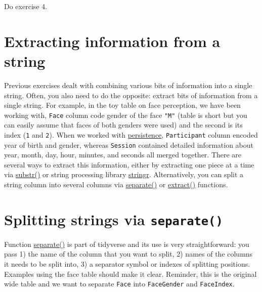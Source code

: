 \documentclass[
]{book}
\begin{document}
Do exercise 4.

\hypertarget{extracting-information-from-a-string}{%
\section{Extracting information from a string}\label{extracting-information-from-a-string}}

Previous exercises dealt with combining various bits of information into a single string. Often, you also need to do the opposite: extract bits of information from a single string. For example, in the toy table on face perception, we have been working with, \texttt{Face} column code gender of the face \texttt{"M"} (table is short but you can easily assume that faces of both genders were used) and the second is its index (\texttt{1} and \texttt{2}). When we worked with \href{data/persistence.csv}{persistence}, \texttt{Participant} column encoded year of birth and gender, whereas \texttt{Session} contained detailed information about year, month, day, hour, minutes, and seconds all merged together. There are several ways to extract this information, either by extracting one piece at a time via \href{https://stat.ethz.ch/R-manual/R-patched/library/base/html/substr.html}{substr()} or string processing library \href{https://stringr.tidyverse.org/}{stringr}. Alternatively, you can split a string column into several columns via \href{https://tidyr.tidyverse.org/reference/separate.html}{separate()} or \href{https://tidyr.tidyverse.org/reference/extract.html}{extract()} functions.

\hypertarget{splitting-strings-via-separate}{%
\section{\texorpdfstring{Splitting strings via \texttt{separate()}}{Splitting strings via separate()}}\label{splitting-strings-via-separate}}

Function \href{https://tidyr.tidyverse.org/reference/separate.html}{separate()} is part of tidyverse and its use is very straightforward: you pass 1) the name of the column that you want to split, 2) names of the columns it needs to be split into, 3) a separator symbol or indexes of splitting positions. Examples using the face table should make it clear. Reminder, this is the original wide table and we want to separate \texttt{Face} into \texttt{FaceGender} and \texttt{FaceIndex}.
\end{document}
